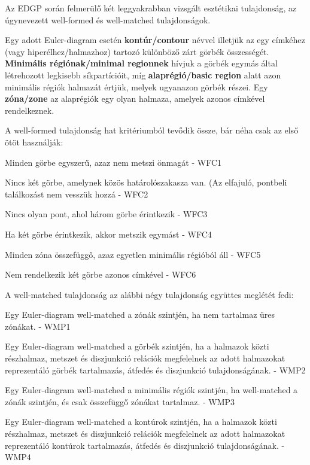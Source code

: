 Az EDGP során felmerülő két leggyakrabban vizsgált\cite{wellmatched_important, euler_force, which_well_formed, well_matchedness, orientation_comprehension} esztétikai tulajdonság, az úgynevezett well-formed és well-matched tulajdonságok.

\begin{definition}
Egy adott Euler-diagram esetén \textbf{kontúr/contour} névvel illetjük az egy címkéhez (vagy hiperélhez/halmazhoz) tartozó különböző zárt görbék összességét. \textbf{Minimális régiónak/minimal regionnek} hívjuk a görbék egymás által létrehozott legkisebb síkpartícióit, míg \textbf{alaprégió/basic region} alatt azon minimális régiók halmazát értjük, melyek ugyanazon görbék részei. Egy \textbf{zóna/zone} az alaprégiók egy olyan halmaza, amelyek azonos címkével rendelkeznek.
\end{definition}

A well-formed tulajdonság hat kritériumból tevődik össze, bár néha csak az első ötöt használják:

\begin{compactenum} \label{wfc}
	\item Minden görbe egyszerű, azaz nem metszi önmagát - WFC1 \label{step:wfc1}
	\item Nincs két görbe, amelynek közös határolószakasza van. (Az elfajuló, pontbeli találkozást nem vesszük hozzá - WFC2 \label{step:wfc2}
	\item Nincs olyan pont, ahol három görbe érintkezik - WFC3 \label{step:wfc3}
	\item Ha két görbe érintkezik, akkor metszik egymást - WFC4 \label{step:wfc4}
	\item Minden zóna összefüggő, azaz egyetlen minimális régióból áll - WFC5 \label{step:wfc5}
	\item Nem rendelkezik két görbe azonos címkével - WFC6 \label{step:wfc6}\\
\end{compactenum}

A well-matched tulajdonság az alábbi négy tulajdonság együttes meglétét fedi:

\begin{compactenum}
	\item Egy Euler-diagram well-matched a zónák szintjén, ha nem tartalmaz üres zónákat. - WMP1
	\item Egy Euler-diagram well-matched a görbék szintjén, ha a halmazok közti részhalmaz, metszet és diszjunkció relációk megfelelnek az adott halmazokat reprezentáló görbék tartalmazás, átfedés és diszjunkció tulajdonságának. - WMP2
	\item Egy Euler-diagram well-matched a minimális régiók szintjén, ha well-matched a zónák szintjén, és csak összefüggő zónákat tartalmaz. - WMP3
	\item Egy Euler-diagram well-matched a kontúrok szintjén, ha a halmazok közti részhalmaz, metszet és diszjunkció relációk megfelelnek az adott halmazokat reprezentáló kontúrok tartalmazás, átfedés és diszjunkció tulajdonságának. - WMP4
\end{compactenum}

